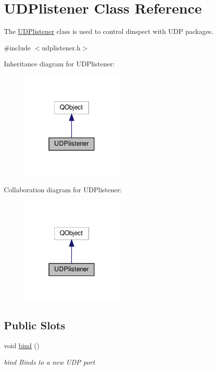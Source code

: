 \hypertarget{classUDPlistener}{}\section{U\+D\+Plistener Class Reference}
\label{classUDPlistener}


The \hyperlink{classUDPlistener}{U\+D\+Plistener} class is used to control dinspect with U\+DP packages.  




{\ttfamily \#include $<$udplistener.\+h$>$}



Inheritance diagram for U\+D\+Plistener\+:
\nopagebreak
\begin{figure}[H]
\begin{center}
\leavevmode
\includegraphics[width=150pt]{classUDPlistener__inherit__graph}
\end{center}
\end{figure}


Collaboration diagram for U\+D\+Plistener\+:
\nopagebreak
\begin{figure}[H]
\begin{center}
\leavevmode
\includegraphics[width=150pt]{classUDPlistener__coll__graph}
\end{center}
\end{figure}
\subsection*{Public Slots}
\begin{DoxyCompactItemize}
\item 
void \hyperlink{classUDPlistener_a4b7a056403f9b80485c92b82c340109a}{bind} ()
\begin{DoxyCompactList}\small\item\em bind Binds to a new U\+DP port \end{DoxyCompactList}\end{DoxyCompactItemize}
